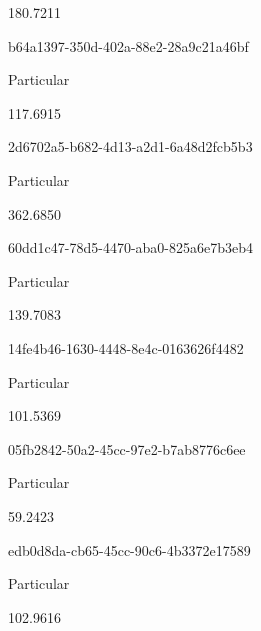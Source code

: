 \documentclass[
  11pt,
  a4paper,
  DIV=11,
  numbers=noendperiod]{scrartcl}
\begin{document}
180.7211

\n    

\n    

\n      

b64a1397-350d-402a-88e2-28a9c21a46bf

\n      

Particular

\n      

117.6915

\n    

\n    

\n      

2d6702a5-b682-4d13-a2d1-6a48d2fcb5b3

\n      

Particular

\n      

362.6850

\n    

\n    

\n      

60dd1c47-78d5-4470-aba0-825a6e7b3eb4

\n      

Particular

\n      

139.7083

\n    

\n    

\n      

14fe4b46-1630-4448-8e4c-0163626f4482

\n      

Particular

\n      

101.5369

\n    

\n    

\n      

05fb2842-50a2-45cc-97e2-b7ab8776c6ee

\n      

Particular

\n      

59.2423

\n    

\n    

\n      

edb0d8da-cb65-45cc-90c6-4b3372e17589

\n      

Particular

\n      

102.9616
\end{document}
